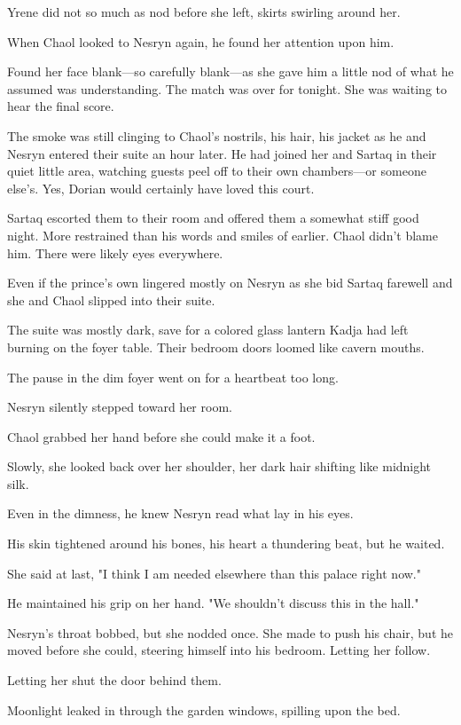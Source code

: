 Yrene did not so much as nod before she left, skirts swirling around her.

When Chaol looked to Nesryn again, he found her attention upon him.

Found her face blank---so carefully blank---as she gave him a little nod of what he assumed was understanding. The match was over for tonight. She was waiting to hear the final score.

The smoke was still clinging to Chaol's nostrils, his hair, his jacket as he and Nesryn entered their suite an hour later. He had joined her and Sartaq in their quiet little area, watching guests peel off to their own chambers---or someone else's. Yes, Dorian would certainly have loved this court.

Sartaq escorted them to their room and offered them a somewhat stiff good night. More restrained than his words and smiles of earlier. Chaol didn't blame him. There were likely eyes everywhere.

Even if the prince's own lingered mostly on Nesryn as she bid Sartaq farewell and she and Chaol slipped into their suite.

The suite was mostly dark, save for a colored glass lantern Kadja had left burning on the foyer table. Their bedroom doors loomed like cavern mouths.

The pause in the dim foyer went on for a heartbeat too long.

Nesryn silently stepped toward her room.

Chaol grabbed her hand before she could make it a foot.

Slowly, she looked back over her shoulder, her dark hair shifting like midnight silk.

Even in the dimness, he knew Nesryn read what lay in his eyes.

His skin tightened around his bones, his heart a thundering beat, but he waited.

She said at last, "I think I am needed elsewhere than this palace right now."

He maintained his grip on her hand. "We shouldn't discuss this in the hall."

Nesryn's throat bobbed, but she nodded once. She made to push his chair, but he moved before she could, steering himself into his bedroom. Letting her follow.

Letting her shut the door behind them.

Moonlight leaked in through the garden windows, spilling upon the bed.

